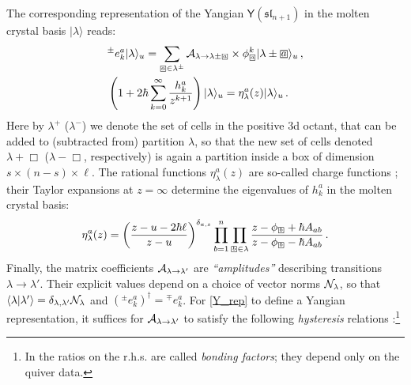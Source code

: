 \documentclass[10pt]{article}
\theoremstyle{definition}
\def\CA{{\cal A}}
\def\CN {{\cal N}}
\def\fl{\mathfrak{l}}
\def\fs{\mathfrak{s}}
\def\fs{\mathfrak{s}}
\def\myY{{\mathsf{Y}}}
\def\lm{\limits}
\numberwithin{equation}{section}
\newcommand\sqbox[1]{{
		\setbox0=\hbox{\mbox{$\Box$}}
		\setbox1=\hbox{\mbox{\raisebox{0.35ex}{\small #1}}}
		\mbox{\raisebox{-0.2ex}{\rlap{\hbox to \wd0{\hss{\box1}\hss}}\box0}}
}}
\newcommand\ssqbox[1]{{
		\setbox0=\hbox{\mbox{$\scriptstyle\Box$}}
		\setbox1=\hbox{\mbox{\raisebox{0.35ex}{\tiny #1}}}
		\mbox{\raisebox{-0.2ex}{\rlap{\hbox to \wd0{\hss{\box1}\hss}}\box0}}
}}
\begin{document}
The corresponding representation of the Yangian $\myY(\fs\fl_{n+1})$ in the molten crystal basis $|\lambda\rangle$ reads:
\begin{equation}\label{Y_rep}
	\begin{aligned}
		&{}^{\pm} e_k^{a}|\lambda\rangle_u=\sum\lm_{\ssqbox{$a$}\in\lambda^{\pm}}\CA_{\lambda\to\lambda\pm\ssqbox{$a$}}\times\phi_{\ssqbox{$a$}}^k|\lambda\pm\sqbox{$a$}\rangle_u\,,\\
		& \left(1+2\hbar\sum\lm_{k=0}^{\infty}\frac{h_k^a}{z^{k+1}}\right)|\lambda\rangle_u=\eta_{\lambda}^a(z)|\lambda\rangle_u\,.
	\end{aligned}
\end{equation}
Here by $\lambda^+$ ($\lambda^-$) we denote the set of cells in the positive 3d octant, that can be added to (subtracted from) partition $\lambda$, so that the new set of cells denoted $\lambda+\Box$ ($\lambda-\Box$, respectively) is again a partition inside a box of dimension $s\times (n-s)\times \ell$.
The rational functions $\eta_{\lambda}^a(z)$ are so-called charge functions \cite{Li:2020rij}; their Taylor expansions at $z=\infty$ determine the eigenvalues of $h_k^a$ in the molten crystal basis:
\begin{equation}
	\eta_{\lambda}^a(z)=\left(\frac{z-u-2\hbar \ell}{z-u}\right)^{\delta_{a,s}}\prod\lm_{b=1}^n\prod\lm_{\ssqbox{$b$}\in\lambda}\frac{z-\phi_{\ssqbox{$b$}}+\hbar A_{ab}}{z-\phi_{\ssqbox{$b$}}-\hbar A_{ab}}\,.
\end{equation}
Finally, the matrix coefficients $\CA_{\lambda\to\lambda'}$ are \emph{``amplitudes''} describing transitions $\lambda\to\lambda'$.
Their explicit values depend on a choice of vector norms $\CN_{\lambda}$, so that $\langle\lambda|\lambda'\rangle=\delta_{\lambda,\lambda'}\CN_{\lambda}$ and $\left({}^{\pm}e_k^a\right)^{\dagger}={}^{\mp}e_k^a$.
For \eqref{Y_rep} to define a Yangian representation, it suffices for $\CA_{\lambda\to\lambda'}$ to satisfy the following \emph{hysteresis} relations \cite{Galakhov:2024bzs}:\footnote{In \cite{Li:2020rij} the ratios on the r.h.s. are called \emph{bonding factors}; they depend only on the quiver data.}
\end{document}
